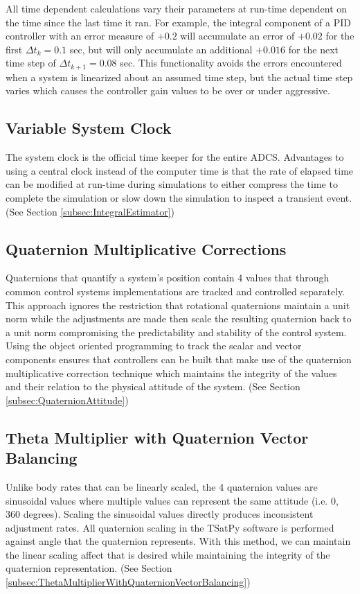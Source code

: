 All time dependent calculations vary their parameters at run-time dependent on the time since the last time it ran. For example, the integral component of a PID controller with an error measure of $+0.2$ will accumulate an error of $+0.02$ for the first $\Delta t_k = 0.1$ sec, but will only accumulate an additional $+0.016$ for the next time step of $\Delta t_{k+1} = 0.08$ sec.  This functionality avoids the errors encountered when a system is linearized about an assumed time step, but the actual time step varies which causes the controller gain values to be over or under aggressive.

\subsection{Variable System Clock}

The system clock is the official time keeper for the entire ADCS. Advantages to using a central clock instead of the computer time is that the rate of elapsed time can be modified at run-time during simulations to either compress the time to complete the simulation or slow down the simulation to inspect a transient event. (See Section \ref{subsec:IntegralEstimator})

\subsection{Quaternion Multiplicative Corrections}

Quaternions that quantify a system's position contain 4 values that through common control systems implementations are tracked and controlled separately. This approach ignores the restriction that rotational quaternions maintain a unit norm while the adjustments are made then scale the resulting quaternion back to a unit norm compromising the predictability and stability of the control system.  Using the object oriented programming to track the scalar and vector components ensures that controllers can be built that make use of the quaternion multiplicative correction technique which maintains the integrity of the values and their relation to the physical attitude of the system. (See Section \ref{subsec:QuaternionAttitude})

\subsection{Theta Multiplier with Quaternion Vector Balancing}

Unlike body rates that can be linearly scaled, the 4 quaternion values are sinusoidal values where multiple values can represent the same attitude (i.e. 0, 360 degrees). Scaling the sinusoidal values directly produces inconsistent adjustment rates. All quaternion scaling in the TSatPy software is performed against angle that the quaternion represents. With this method, we can maintain the linear scaling affect that is desired while maintaining the integrity of the quaternion representation. (See Section \ref{subsec:ThetaMultiplierWithQuaternionVectorBalancing})

